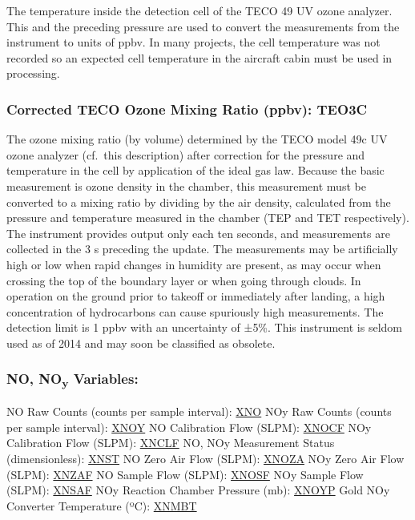 \documentclass[
]{book}
\begin{document}
The temperature inside the detection cell of the TECO 49 UV ozone analyzer. This and the preceding pressure are used to convert the measurements from the instrument to units of ppbv. In many projects, the cell temperature was not recorded so an expected cell temperature in the aircraft cabin must be used in processing.

\hypertarget{te03c}{%
\subsubsection*{Corrected TECO Ozone Mixing Ratio (ppbv): TEO3C}\label{te03c}}

The ozone mixing ratio (by volume) determined by the TECO model 49c UV ozone analyzer (cf.~this description) after correction for the pressure and temperature in the cell by application of the ideal gas law. Because the basic measurement is ozone density in the chamber, this measurement must be converted to a mixing ratio by dividing by the air density, calculated from the pressure and temperature measured in the chamber (TEP and TET respectively). The instrument provides output only each ten seconds, and measurements are collected in the 3 s preceding the update. The measurements may be artificially high or low when rapid changes in humidity are present, as may occur when crossing the top of the boundary layer or when going through clouds. In operation on the ground prior to takeoff or immediately after landing, a high concentration of hydrocarbons can cause spuriously high measurements. The detection limit is 1 ppbv with an uncertainty of {±}5\%. This instrument is seldom used as of 2014 and may soon be classified as obsolete.

\hypertarget{no-noy}{%
\subsubsection*{\texorpdfstring{NO, NO\textsubscript{y} Variables:}{NO, NOy Variables:}}\label{no-noy}}

NO Raw Counts (counts per sample interval): \uline{XNO}
NOy Raw Counts (counts per sample interval): \uline{XNOY}
NO Calibration Flow (SLPM): \uline{XNOCF}
NOy Calibration Flow (SLPM): \uline{XNCLF}
NO, NOy Measurement Status (dimensionless): \uline{XNST}
NO Zero Air Flow (SLPM): \uline{XNOZA}
NOy Zero Air Flow (SLPM): \uline{XNZAF}
NO Sample Flow (SLPM): \uline{XNOSF}
NOy Sample Flow (SLPM): \uline{XNSAF}
NOy Reaction Chamber Pressure (mb): \uline{XNOYP}
Gold NOy Converter Temperature ({º}C): \uline{XNMBT}
\end{document}
